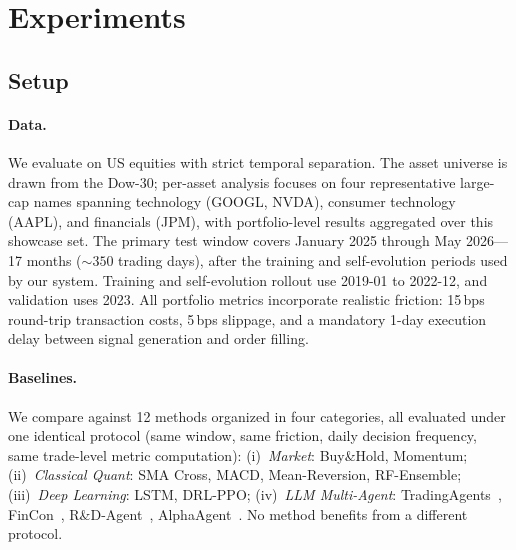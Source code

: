 \section{Experiments}
\label{sec:experiments}

\subsection{Setup}

\paragraph{Data.} We evaluate on US equities with strict temporal separation. The asset universe is drawn from the Dow-30; per-asset analysis focuses on four representative large-cap names spanning technology (GOOGL, NVDA), consumer technology (AAPL), and financials (JPM), with portfolio-level results aggregated over this showcase set. The primary test window covers January 2025 through May 2026---17 months (${\sim}350$ trading days), after the training and self-evolution periods used by our system. Training and self-evolution rollout use 2019-01 to 2022-12, and validation uses 2023. All portfolio metrics incorporate realistic friction: 15\,bps round-trip transaction costs, 5\,bps slippage, and a mandatory 1-day execution delay between signal generation and order filling.


\paragraph{Baselines.} We compare against 12 methods organized in four categories, all evaluated under one identical protocol (same window, same friction, daily decision frequency, same trade-level metric computation): (i)~\emph{Market}: Buy\&Hold, Momentum; (ii)~\emph{Classical Quant}: SMA Cross, MACD, Mean-Reversion, RF-Ensemble; (iii)~\emph{Deep Learning}: LSTM, DRL-PPO; (iv)~\emph{LLM Multi-Agent}: TradingAgents~\cite{tradingagents2025}, FinCon~\cite{fincon2024}, R\&D-Agent~\cite{rdagent2025}, AlphaAgent~\cite{alphaagent2025}. No method benefits from a different protocol.

